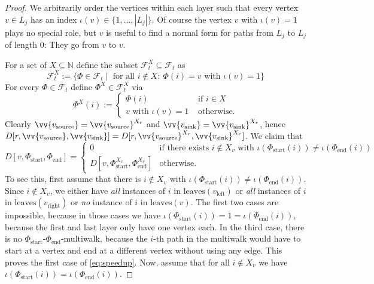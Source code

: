 \documentclass[10pt,a4paper]{article}
\numberwithin{equation}{section}
\theoremstyle{definition}
\newcommand{\IN}{\mathbb{N}}
\newcommand{\CF}{\mathcal{F}}
\begin{document}
\begin{proof}
We arbitrarily order the vertices within each layer such that every vertex $v \in L_j$ has an index $\iota(v) \in \{1,\ldots,|L_j|\}$. Of course the vertex $v$ with $\iota(v)=1$ plays no special role, but $v$ is useful to find a normal form for paths from $L_j$ to $L_j$ of length 0: They go from $v$ to $v$.

For a set of $X \subseteq \IN$
define the subset $\CF_{t}^{X}\subseteq \CF_{t}$ as
\[
\CF_{t}^{X} := \{\Phi \in \CF_{t} \mid \text{ for all } i \notin X: \ \Phi(i)=v \text{ with } \iota(v)=1\}
\]
For every $\Phi \in \CF_{t}$ define $\Phi^X \in \CF_{t}^X$ via
\begin{equation}\label{eq:defsupX}
\Phi^X(i) := \begin{cases}
\Phi(i) & \text{ if } i \in X \\
v \text{ with } \iota(v)=1 & \text{ otherwise}.
\end{cases}
\end{equation}
Clearly $\vv{v_{\textup{source}}}=\vv{v_{\textup{source}}}^{X_r}$ and $\vv{v_{\textup{sink}}}=\vv{v_{\textup{sink}}}^{X_r}$, hence $D[r, \vv{v_{\textup{source}}}, \vv{v_{\textup{sink}}}]=D[r, \vv{v_{\textup{source}}}^{X_r}, \vv{v_{\textup{sink}}}^{X_r}]$.
We claim that
\begin{equation}\label{eq:speedup}
D[v,\Phi_\text{start}, \Phi_\text{end}]=
\begin{cases}
0 & \text{if there exists $i \notin X_v$ with $\iota(\Phi_\text{start}(i))\neq\iota(\Phi_\text{end}(i))$} \\
D[v,\Phi_\text{start}^{X_v}, \Phi_\text{end}^{X_v}]
& \text{otherwise}.
\end{cases}
\end{equation}
To see this, first assume that there is $i \notin X_v$ with $\iota(\Phi_\text{start}(i))\neq\iota(\Phi_\text{end}(i))$.
Since $i \notin X_v$, we either have \emph{all} instances of $i$ in $\text{leaves}(v_\text{left})$ or \emph{all} instances of $i$ in $\text{leaves}(v_\text{right})$ or \emph{no} instance of $i$ in $\text{leaves}(v)$. The first two cases are impossible, because in those cases we have $\iota(\Phi_\text{start}(i))=1=\iota(\Phi_\text{end}(i))$, because the first and last layer only have one vertex each. In the third case, there is no $\Phi_\text{start}$-$\Phi_\text{end}$-multiwalk, because the $i$-th path in the multiwalk would have to start at a vertex and end at a different vertex without using any edge. This proves the first case of \eqref{eq:speedup}.
Now, assume that for all $i \notin X_v$ we have $\iota(\Phi_\text{start}(i))=\iota(\Phi_\text{end}(i))$.

\end{proof}
\end{document}
